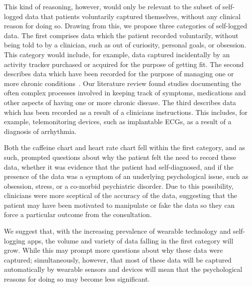 \documentclass{sigchi}
\begin{document}
This kind of reasoning, however, would only be relevant to the subset of self-logged data that patients voluntarily captured themselves, without any clinical reason for doing so.  Drawing from this, we propose three categories of self-logged data. The first comprises data which the patient recorded voluntarily, without being told to by a clinician, such as out of curiosity, personal goals, or obsession. This category would include, for example, data captured incidentally by an activity tracker purchased or acquired for the purpose of getting fit. The second describes data which have been recorded for the purpose of managing one or more chronic conditions~\cite{ancker_invisible_2015}.  Our literature review found studies documenting the often complex processes involved in keeping track of symptoms, medications and other aspects of having one or more chronic disease. The third describes data which has been recorded as a result of a clinicians instructions. This includes, for example, telemonitoring devices, such as implantable ECGs, as a result of a diagnosis of arrhythmia.

Both the caffeine chart and heart rate chart fell within the first category, and as such, prompted questions about why the patient felt the need to record these data, whether it was evidence that the patient had self-diagnosed, and if the presence of the data was a symptom of an underlying psychological issue, such as obsession, stress, or a co-morbid psychiatric disorder. Due to this possibility, clinicians were more sceptical of the accuracy of the data, suggesting that the patient may have been motivated to manipulate or fake the data so they can force a particular outcome from the consultation.

We suggest that, with the increasing prevalence of wearable technology and self-logging apps, the volume and variety of data falling in the first category will grow.  While this may prompt more questions about why these data were captured; simultaneously, however, that most of these data will be captured automatically by wearable sensors and devices will mean that the psychological reasons for doing so may become less significant.


\end{document}
